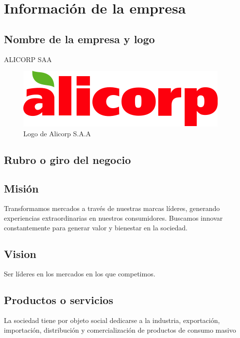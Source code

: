 \section{Información de la empresa}

\subsection{Nombre de la empresa y logo}
ALICORP SAA\\
\begin{figure}[!ht]
    \centering
    \includegraphics[scale = 0.6]{./figuras/logo_alicorp.png}	 
    \caption{Logo de Alicorp S.A.A}
\end{figure}


\subsection{Rubro o giro del negocio}

\subsection{Misión}
Transformamos mercados a través de nuestras marcas líderes, generando experiencias extraordinarias en nuestros consumidores. Buscamos innovar constantemente para generar valor y bienestar en la sociedad.

\subsection{Vision}
Ser líderes en los mercados en los que competimos.
\subsection{Productos o servicios}
La sociedad tiene por objeto social dedicarse a la industria, exportación, importación, distribución y comercialización de productos de consumo masivo

